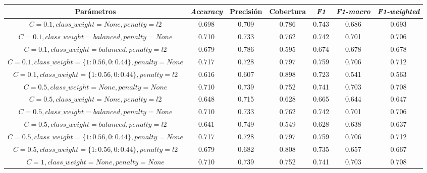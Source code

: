 \begin{table}[h!]
    \centering
    \begin{adjustbox}{max width=\textwidth}
    \begin{tabular}{ *{7}{|c}| }
    \hline
    Par\'ametros & \textit{Accuracy} & Precisi\'on & Cobertura & \textit{F1} & \textit{F1-macro} & \textit{F1-weighted} \\
    \hline\hline
    $C=0.1, class\_weight=None, penalty=l2$ & 0.698 & 0.709 & 0.786 & 0.743 & 0.686 & 0.693 \\
    \hline
    $C=0.1, class\_weight=balanced, penalty=None$ & 0.710 & 0.733 & 0.762 & 0.742 & 0.701 & 0.706 \\
    \hline
    $C=0.1, class\_weight=balanced, penalty=l2$ & 0.679 & 0.786 & 0.595 & 0.674 & 0.678 & 0.678 \\
    \hline
    $C=0.1, class\_weight=\lbrace1: 0.56, 0: 0.44\rbrace, penalty=None$ & 0.717 & 0.728 & 0.797 & 0.759 & 0.706 & 0.712 \\
    \hline
    $C=0.1, class\_weight=\lbrace1: 0.56, 0: 0.44\rbrace, penalty=l2$ & 0.616 & 0.607 & 0.898 & 0.723 & 0.541 & 0.563 \\
    \hline
    $C=0.5, class\_weight=None, penalty=None$ & 0.710 & 0.739 & 0.752 & 0.741 & 0.703 & 0.708 \\
    \hline
    $C=0.5, class\_weight=None, penalty=l2$ & 0.648 & 0.715 & 0.628 & 0.665 & 0.644 & 0.647 \\
    \hline
    $C=0.5, class\_weight=balanced, penalty=None$ & 0.710 & 0.733 & 0.762 & 0.742 & 0.701 & 0.706 \\
    \hline
    $C=0.5, class\_weight=balanced, penalty=l2$ & 0.641 & 0.749 & 0.549 & 0.628 & 0.638 & 0.637 \\
    \hline
    $C=0.5, class\_weight=\lbrace1: 0.56, 0: 0.44\rbrace, penalty=None$ & 0.717 & 0.728 & 0.797 & 0.759 & 0.706 & 0.712 \\
    \hline
    $C=0.5, class\_weight=\lbrace1: 0.56, 0: 0.44\rbrace, penalty=l2$ & 0.679 & 0.682 & 0.808 & 0.735 & 0.657 & 0.667 \\
    \hline
    $C=1, class\_weight=None, penalty=None$ & 0.710 & 0.739 & 0.752 & 0.741 & 0.703 & 0.708 \\

\end{tabular}
\end{adjustbox}
\end{table}
